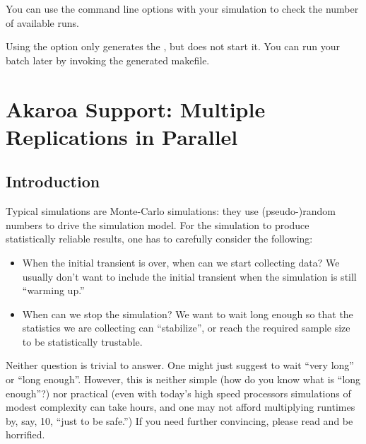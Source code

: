 You can use the  command line options with your
simulation to check the number of available runs.

Using the  option only generates the
, but does not start it. You can run your batch later by
invoking the generated makefile.



\section{Akaroa Support: Multiple Replications in Parallel}
\label{sec:run-sim:akaroa}

\subsection{Introduction}
\label{sec:run-sim:akaroa-introduction}

Typical simulations are Monte-Carlo simulations: they use
(pseudo-)random numbers to drive the simulation model.
For the simulation to produce statistically reliable results,
one has to carefully consider the following:

\begin{itemize}
  \item{When the initial transient is over, when can we start
    collecting data? We usually don't want to include the
    initial transient when the simulation is still ``warming up.''}
  \item{When can we stop the simulation? We want to wait long enough
    so that the statistics we are collecting can ``stabilize'',
    or reach the required sample size to be statistically trustable.}
\end{itemize}

Neither question is trivial to answer. One might just suggest
to wait ``very long'' or ``long enough''. However, this is neither
simple (how do you know what is ``long enough''?) nor practical
(even with today's high speed processors simulations of modest complexity
can take hours, and one may not afford multiplying runtimes by,
say, 10, ``just to be safe.'') If you need further convincing,
please read \cite{Pawlikowsky02} and be horrified.

